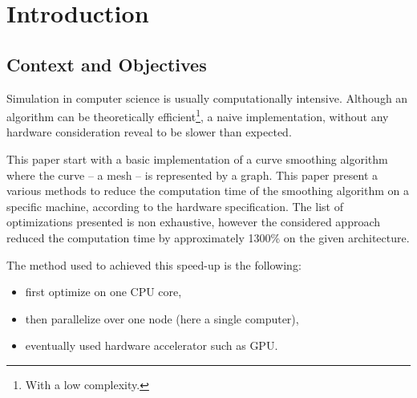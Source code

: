 \documentclass[fleqn,11pt]{SelfArx} %
\affiliation{\textsuperscript{1}RB812 \hfill \textsuperscript{2}AC5612 \hfill \textsuperscript{3}GF210}
\theoremstyle{definition}
\begin{document}



\flushbottom %

\maketitle %

\tableofcontents %

\thispagestyle{empty} %


\section{Introduction}
\subsection{Context and Objectives}

Simulation in computer science is usually computationally intensive. Although an algorithm can be theoretically efficient\footnote{With a low complexity.}, a naive implementation, without any hardware consideration reveal to be slower than expected.

This paper start with a basic implementation of a curve smoothing algorithm where the curve -- a mesh -- is represented by a graph. This paper present a various methods to reduce the computation time of the smoothing algorithm on a specific machine, according to the hardware specification. The list of optimizations presented is non exhaustive, however the considered approach reduced the computation time by approximately 1300\% on the given architecture.

The method used to achieved this speed-up is the following:
\begin{itemize}  \vspace{-4mm}
\item first optimize on one CPU core, \vspace{-4mm}
\item then parallelize over one node (here a single computer), \vspace{-4mm}
\item eventually used hardware accelerator such as GPU.
\end{itemize}
\end{document}
